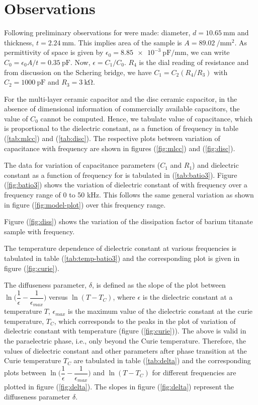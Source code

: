 \documentclass[%
 aip,
 amsmath,amssymb,
 reprint, floatfix%
]{revtex4-1}
\begin{document}
\section{Observations}
    Following preliminary observations for  were made: diameter, $d = \SI{10.65}{\milli \metre}$ and thickness, $t = \SI{2.24}{\milli \metre}$. This implies area of the sample is $A = \SI{89.02}{\per \milli \metre \squared}$. As permittivity of space is given by $\epsilon_0 = \SI{8.85e-3}{\pico \farad \per \milli \metre}$, we can write $C_0 = \epsilon_0 A/t = \SI{0.35}{\pico \farad}$. Now, $\epsilon = C_1/C_0$. $R_4$ is the dial reading of resistance and from discussion on the Schering bridge, we have $C_1 = C_2 (R_4/R_3)$ with $C_2 = \SI{1000}{\pico \farad}$ and $R_3 = \SI{3}{\kilo \ohm}$.
    \par
    For the multi-layer ceramic capacitor and the disc ceramic capacitor, in the absence of dimensional information of commercially available capacitors, the value of $C_0$ cannot be computed. Hence, we tabulate value of capacitance, which is proportional to the dielectric constant, as a function of frequency in table (\ref{tab:mlcc}) and (\ref{tab:disc}). The respective plots between variation of capacitance with frequency are shown in figures (\ref{fig:mlcc}) and (\ref{fig:disc}). 
    \par
    The data for variation of capacitance parameters ($C_1$ and $R_1$) and dielectric constant as a function of frequency for  is tabulated in (\ref{tab:batio3}). Figure (\ref{fig:batio3}) shows the variation of dielectric constant of  with frequency over a frequency range of 0 to 50 kHz. This follows the same general variation as shown in figure (\ref{fig:model-plot}) over this frequency range.
    \par
    Figure (\ref{fig:diss}) shows the variation of the dissipation factor of barium titanate sample with frequency.
    \par
    The temperature dependence of dielectric constant at various frequencies is tabulated in table (\ref{tab:temp-batio3}) and the corresponding plot is given in figure (\ref{fig:curie}). 
    \par
    The diffuseness parameter, $\delta$, is defined as the slope of the plot between $\ln \Big( \dfrac{1}{\epsilon} - \dfrac{1}{\epsilon_{max}} \Big)$ versus $\ln (T- T_C)$, where $\epsilon$ is the dielectric constant at a temperature $T$, $\epsilon_{max}$ is the maximum value of the dielectric constant at the curie temperature, $T_C$, which corresponds to the peaks in the plot of variation of dielectric constant with temperature (figure (\ref{fig:curie})). The above is valid in the paraelectric phase, i.e., only beyond the Curie temperature. Therefore, the values of dielectric constant and other parameters after phase transition at the Curie temperature $T_C$ are tabulated in table (\ref{tab:delta}) and the corresponding plots between $\ln \Big( \dfrac{1}{\epsilon} - \dfrac{1}{\epsilon_{max}} \Big)$ and $\ln (T- T_C)$ for different frequencies are plotted in figure (\ref{fig:delta}). The slopes in figure (\ref{fig:delta}) represent the diffuseness parameter $\delta$.
    
\end{document}
